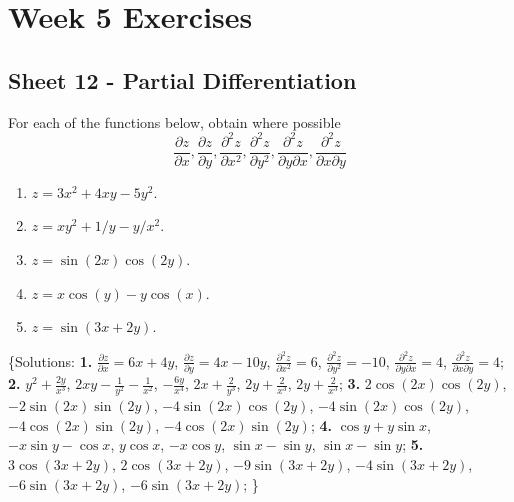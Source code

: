 \documentclass[
  11pt,
  oneside]{book}
\providecommand{\tightlist}{%
  \setlength{\itemsep}{0pt}\setlength{\parskip}{0pt}}
\newcommand{\slide}{}
\theoremstyle{definition}
\theoremstyle{definition}
\theoremstyle{definition}
\theoremstyle{definition}
\theoremstyle{remark}
\begin{document}
\chapter*{Week 5 Exercises}\label{week-5-exercises}

\section{Sheet 12 - Partial Differentiation}\label{sheet-12---partial-differentiation}

For each of the functions below, obtain where possible
\[
\frac{\partial z}{\partial x}, \frac{\partial z}{\partial y}, \frac{\partial^2 z}{\partial x^2}, \frac{\partial^2 z}{\partial y^2}, \frac{\partial^2 z}{\partial y\partial x}, \frac{\partial^2 z}{\partial x\partial y}
\]

\begin{enumerate}
\def\labelenumi{\arabic{enumi}.}
\tightlist
\item
  \(z=3x^2+4xy-5y^2\).
\item
  \(z=xy^2+1/y-y/x^2\).
\item
  \(z=\sin(2x)\cos(2y)\).
\item
  \(z=x\cos(y)-y\cos(x)\).
\item
  \(z=\sin(3x+2y)\).
\end{enumerate}

\{Solutions:
\textbf{1.} \(\frac{\partial z}{\partial x}=6x+4y\), \(\frac{\partial z}{\partial y}=4 x - 10 y\), \(\frac{\partial^2 z}{\partial x^2}=6\), \(\frac{\partial^2 z}{\partial y^2}=-10\), \(\frac{\partial^2 z}{\partial y\partial x}=4\), \(\frac{\partial^2 z}{\partial x\partial y}=4\);
\textbf{2.} \(y^2+{\frac{2y}{x^3}}\), \(2xy-{\frac{1}{y^2}}-{\frac{1}{x^2}}\), \(-{\frac{6y}{x^4}}\), \(2x+{\frac{2}{y^3}}\), \(2y+{\frac{2}{x^3}}\), \(2y+{\frac{2}{x^3}}\);
\textbf{3.} \(2\cos \left(2x\right)\cos \left(2y\right)\), \(-2\sin \left(2x\right)\sin \left(2y\right)\), \(-4\sin \left(2x\right)\cos \left(2y\right)\), \(-4\sin \left(2x\right)\cos \left(2y\right)\), \(-4\cos \left(2x\right)\sin \left(2y\right)\), \(-4\cos \left(2x\right)\sin \left(2y\right)\);
\textbf{4.} \(\cos y+y\sin x\), \(-x\sin y-\cos x\), \(y\cos x\), \(-x\cos y\), \(\sin x-\sin y\), \(\sin x-\sin y\);
\textbf{5.} \(3\cos \left(3x+2y\right)\), \(2\cos \left(3x+2y\right)\), \(-9\sin \left(3x+2y\right)\), \(-4\sin \left(3x+2y\right)\), \(-6\sin \left(3x+2y\right)\), \(-6\sin \left(3x+2y\right)\);
\}

\slide
\end{document}
